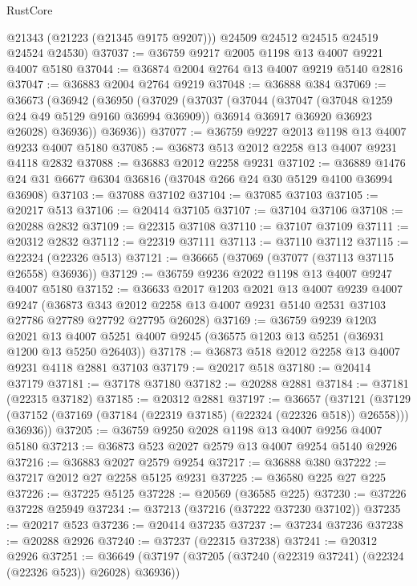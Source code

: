 \begin{lexlean}{RustCore}
\begin{coremodule}
        @21343
        (@21223 (@21345 @9175 @9207)))
      @24509
      @24512
      @24515
      @24519
      @24524
      @24530)
@37037 := @36759 @9217 @2005 @1198 @13 @4007 @9221 @4007 @5180
@37044 := @36874 @2004 @2764 @13 @4007 @9219 @5140 @2816
@37047 := @36883 @2004 @2764 @9219
@37048 := @36888 @384
@37069 := @36673
    (@36942
      (@36950
        (@37029
          (@37037
            (@37044
              (@37047 (@37048 @1259 @24 @49 @5129 @9160 @36994 @36909))
              @36914
              @36917
              @36920
              @36923
              @26028)
            @36936))
        @36936))
@37077 := @36759 @9227 @2013 @1198 @13 @4007 @9233 @4007 @5180
@37085 := @36873 @513 @2012 @2258 @13 @4007 @9231 @4118 @2832
@37088 := @36883 @2012 @2258 @9231
@37102 := @36889 @1476 @24 @31 @6677 @6304 @36816 (@37048 @266 @24 @30 @5129 @4100 @36994 @36908)
@37103 := @37088 @37102
@37104 := @37085 @37103
@37105 := @20217 @513
@37106 := @20414 @37105
@37107 := @37104 @37106
@37108 := @20288 @2832
@37109 := @22315 @37108
@37110 := @37107 @37109
@37111 := @20312 @2832
@37112 := @22319 @37111
@37113 := @37110 @37112
@37115 := @22324 (@22326 @513)
@37121 := @36665 (@37069 (@37077 (@37113 @37115 @26558) @36936))
@37129 := @36759 @9236 @2022 @1198 @13 @4007 @9247 @4007 @5180
@37152 := @36633
    @2017
    @1203
    @2021
    @13
    @4007
    @9239
    @4007
    @9247
    (@36873 @343 @2012 @2258 @13 @4007 @9231 @5140 @2531 @37103 @27786 @27789 @27792 @27795 @26028)
@37169 := @36759
    @9239
    @1203
    @2021
    @13
    @4007
    @5251
    @4007
    @9245
    (@36575 @1203 @13 @5251 (@36931 @1200 @13 @5250 @26403))
@37178 := @36873 @518 @2012 @2258 @13 @4007 @9231 @4118 @2881 @37103
@37179 := @20217 @518
@37180 := @20414 @37179
@37181 := @37178 @37180
@37182 := @20288 @2881
@37184 := @37181 (@22315 @37182)
@37185 := @20312 @2881
@37197 := @36657
    (@37121
      (@37129 (@37152 (@37169 (@37184 (@22319 @37185) (@22324 (@22326 @518)) @26558))) @36936))
@37205 := @36759 @9250 @2028 @1198 @13 @4007 @9256 @4007 @5180
@37213 := @36873 @523 @2027 @2579 @13 @4007 @9254 @5140 @2926
@37216 := @36883 @2027 @2579 @9254
@37217 := @36888 @380
@37222 := @37217 @2012 @27 @2258 @5125 @9231
@37225 := @36580 @225 @27 @225
@37226 := @37225 @5125
@37228 := @20569 (@36585 @225)
@37230 := @37226 @37228 @25949
@37234 := @37213 (@37216 (@37222 @37230 @37102))
@37235 := @20217 @523
@37236 := @20414 @37235
@37237 := @37234 @37236
@37238 := @20288 @2926
@37240 := @37237 (@22315 @37238)
@37241 := @20312 @2926
@37251 := @36649 (@37197 (@37205 (@37240 (@22319 @37241) (@22324 (@22326 @523)) @26028) @36936))

\end{coremodule}
\end{lexlean}
